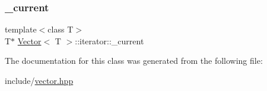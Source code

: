 \subsubsection{\texorpdfstring{\+\_\+current}{\_current}}
{\footnotesize\ttfamily template$<$class T$>$ \\
T$\ast$ \hyperlink{classVector}{Vector}$<$ T $>$\+::iterator\+::\+\_\+current\hspace{0.3cm}{\ttfamily [protected]}}



The documentation for this class was generated from the following file\+:\begin{DoxyCompactItemize}
\item 
include/\hyperlink{vector_8hpp}{vector.\+hpp}\end{DoxyCompactItemize}
